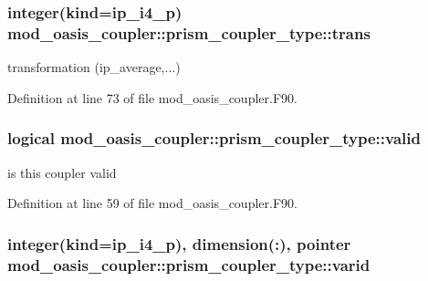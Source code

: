 \hypertarget{structmod__oasis__coupler_1_1prism__coupler__type_ad9fad1fec923d4db974f94fd0bca5697}{
\subsubsection[{trans}]{\setlength{\rightskip}{0pt plus 5cm}integer(kind=ip\+\_\+i4\+\_\+p) mod\+\_\+oasis\+\_\+coupler\+::prism\+\_\+coupler\+\_\+type\+::trans\hspace{0.3cm}{\ttfamily [private]}}}\label{structmod__oasis__coupler_1_1prism__coupler__type_ad9fad1fec923d4db974f94fd0bca5697}


transformation (ip\+\_\+average,...) 



Definition at line 73 of file mod\+\_\+oasis\+\_\+coupler.\+F90.

\hypertarget{structmod__oasis__coupler_1_1prism__coupler__type_aceee78ca0ec709406b404ff29e1fcf18}{
\subsubsection[{valid}]{\setlength{\rightskip}{0pt plus 5cm}logical mod\+\_\+oasis\+\_\+coupler\+::prism\+\_\+coupler\+\_\+type\+::valid\hspace{0.3cm}{\ttfamily [private]}}}\label{structmod__oasis__coupler_1_1prism__coupler__type_aceee78ca0ec709406b404ff29e1fcf18}


is this coupler valid 



Definition at line 59 of file mod\+\_\+oasis\+\_\+coupler.\+F90.

\hypertarget{structmod__oasis__coupler_1_1prism__coupler__type_a9e31592685ea4cb2da222187ee2ffa4b}{
\subsubsection[{varid}]{\setlength{\rightskip}{0pt plus 5cm}integer(kind=ip\+\_\+i4\+\_\+p), dimension(\+:), pointer mod\+\_\+oasis\+\_\+coupler\+::prism\+\_\+coupler\+\_\+type\+::varid\hspace{0.3cm}{\ttfamily [private]}}}\label{structmod__oasis__coupler_1_1prism__coupler__type_a9e31592685ea4cb2da222187ee2ffa4b}


